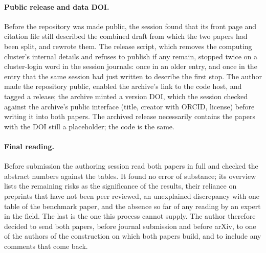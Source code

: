 \documentclass[11pt,a4paper]{article}
\begin{document}
\paragraph{Public release and data DOI.} Before the repository was made public, the session found that its front page and citation file still described the combined draft from which the two papers had been split, and rewrote them. The release script, which removes the computing cluster's internal details and refuses to publish if any remain, stopped twice on a cluster-login word in the session journals: once in an older entry, and once in the entry that the same session had just written to describe the first stop. The author made the repository public, enabled the archive's link to the code host, and tagged a release; the archive minted a version DOI, which the session checked against the archive's public interface (title, creator with ORCID, license) before writing it into both papers. The archived release necessarily contains the papers with the DOI still a placeholder; the code is the same.

\paragraph{Final reading.} Before submission the authoring session read both papers in full and checked the abstract numbers against the tables. It found no error of substance; its overview lists the remaining risks as the significance of the results, their reliance on preprints that have not been peer reviewed, an unexplained discrepancy with one table of the benchmark paper, and the absence so far of any reading by an expert in the field. The last is the one this process cannot supply. The author therefore decided to send both papers, before journal submission and before arXiv, to one of the authors of the construction on which both papers build, and to include any comments that come back.
\end{document}
